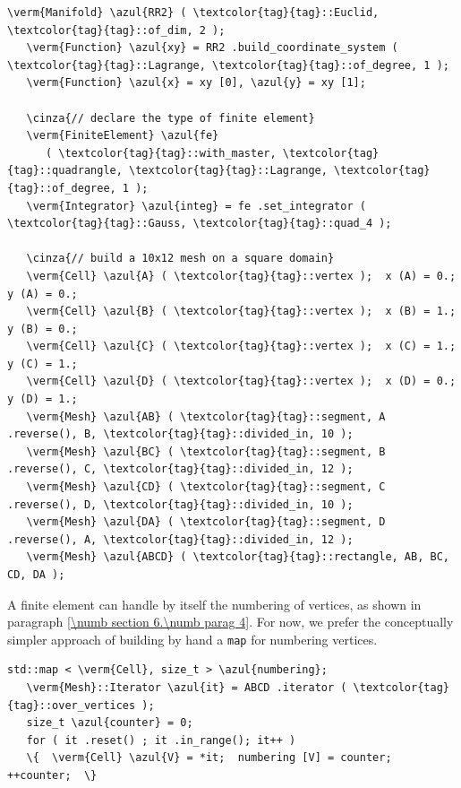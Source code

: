 \begin{Verbatim}[commandchars=\\\{\},formatcom=\small\tt,frame=single,
   label=parag-\ref{\numb section 6.\numb parag 2}.cpp,rulecolor=\color{coment},
   baselinestretch=0.94,framesep=2mm                                            ]
   \verm{Manifold} \azul{RR2} ( \textcolor{tag}{tag}::Euclid, \textcolor{tag}{tag}::of_dim, 2 );
   \verm{Function} \azul{xy} = RR2 .build_coordinate_system ( \textcolor{tag}{tag}::Lagrange, \textcolor{tag}{tag}::of_degree, 1 );
   \verm{Function} \azul{x} = xy [0], \azul{y} = xy [1];

   \cinza{// declare the type of finite element}
   \verm{FiniteElement} \azul{fe}
      ( \textcolor{tag}{tag}::with_master, \textcolor{tag}{tag}::quadrangle, \textcolor{tag}{tag}::Lagrange, \textcolor{tag}{tag}::of_degree, 1 );
   \verm{Integrator} \azul{integ} = fe .set_integrator ( \textcolor{tag}{tag}::Gauss, \textcolor{tag}{tag}::quad_4 );

   \cinza{// build a 10x12 mesh on a square domain}
   \verm{Cell} \azul{A} ( \textcolor{tag}{tag}::vertex );  x (A) = 0.;   y (A) = 0.;
   \verm{Cell} \azul{B} ( \textcolor{tag}{tag}::vertex );  x (B) = 1.;   y (B) = 0.;
   \verm{Cell} \azul{C} ( \textcolor{tag}{tag}::vertex );  x (C) = 1.;   y (C) = 1.;
   \verm{Cell} \azul{D} ( \textcolor{tag}{tag}::vertex );  x (D) = 0.;   y (D) = 1.;
   \verm{Mesh} \azul{AB} ( \textcolor{tag}{tag}::segment, A .reverse(), B, \textcolor{tag}{tag}::divided_in, 10 );
   \verm{Mesh} \azul{BC} ( \textcolor{tag}{tag}::segment, B .reverse(), C, \textcolor{tag}{tag}::divided_in, 12 );
   \verm{Mesh} \azul{CD} ( \textcolor{tag}{tag}::segment, C .reverse(), D, \textcolor{tag}{tag}::divided_in, 10 );
   \verm{Mesh} \azul{DA} ( \textcolor{tag}{tag}::segment, D .reverse(), A, \textcolor{tag}{tag}::divided_in, 12 );
   \verm{Mesh} \azul{ABCD} ( \textcolor{tag}{tag}::rectangle, AB, BC, CD, DA );
\end{Verbatim}

A finite element can handle by itself the numbering of vertices, as shown in paragraph
\ref{\numb section 6.\numb parag 4}.
For now, we prefer the conceptually simpler approach of building by hand a {\small\tt map}
for numbering vertices.

\begin{Verbatim}[commandchars=\\\{\},formatcom=\small\tt,frame=single,
   label=parag-\ref{\numb section 6.\numb parag 2}.cpp,rulecolor=\color{coment},
   baselinestretch=0.94,framesep=2mm                                            ]
   std::map < \verm{Cell}, size_t > \azul{numbering};
   \verm{Mesh}::Iterator \azul{it} = ABCD .iterator ( \textcolor{tag}{tag}::over_vertices );
   size_t \azul{counter} = 0;
   for ( it .reset() ; it .in_range(); it++ )
   \{  \verm{Cell} \azul{V} = *it;  numbering [V] = counter;  ++counter;  \}
\end{Verbatim}

